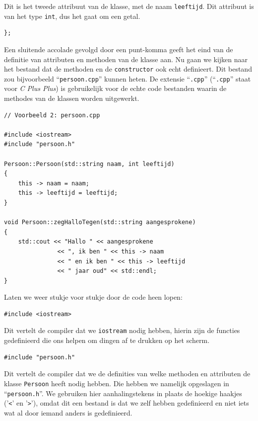 \documentclass{article}
\begin{document}
Dit is het tweede attribuut van de klasse, met de naam \texttt{leeftijd}. Dit attribuut is van het type \texttt{int}, dus het gaat om een getal.

\begin{lstlisting}[frame=none]
};
\end{lstlisting}

Een sluitende accolade gevolgd door een punt-komma geeft het eind van de definitie van attributen en methoden van de klasse aan. Nu gaan we kijken naar het bestand dat de methoden en de \texttt{constructor} ook echt definieert. Dit bestand zou bijvoorbeeld “\texttt{persoon.cpp}” kunnen heten. De extensie “\texttt{.cpp}” (“\texttt{.cpp}” staat voor \emph{C Plus Plus}) is gebruikelijk voor de echte code bestanden waarin de methodes van de klassen worden uitgewerkt.

\begin{lstlisting}
// Voorbeeld 2: persoon.cpp

#include <iostream>
#include "persoon.h"

Persoon::Persoon(std::string naam, int leeftijd)
{
    this -> naam = naam;
    this -> leeftijd = leeftijd;
}

void Persoon::zegHalloTegen(std::string aangesprokene)
{
    std::cout << "Hallo " << aangesprokene
               << ", ik ben " << this -> naam
               << " en ik ben " << this -> leeftijd
               << " jaar oud" << std::endl;
}
\end{lstlisting}

Laten we weer stukje voor stukje door de code heen lopen:

\begin{lstlisting}[frame=none]
#include <iostream>
\end{lstlisting}

Dit vertelt de compiler dat we \texttt{iostream} nodig hebben, hierin zijn de functies gedefinieerd die
ons helpen om dingen af te drukken op het scherm.

\begin{lstlisting}[frame=none]
#include "persoon.h"
\end{lstlisting}

Dit vertelt de compiler dat we de definities van welke methoden en attributen de klasse \texttt{Persoon} heeft nodig hebben. Die hebben we namelijk opgeslagen in “\texttt{persoon.h}”. We gebruiken hier aanhalingstekens in plaats de hoekige haakjes ('\texttt{<}' en '\texttt{>}'), omdat dit een bestand is dat we zelf hebben gedefinieerd en niet iets wat al door iemand anders is gedefinieerd.
\end{document}
